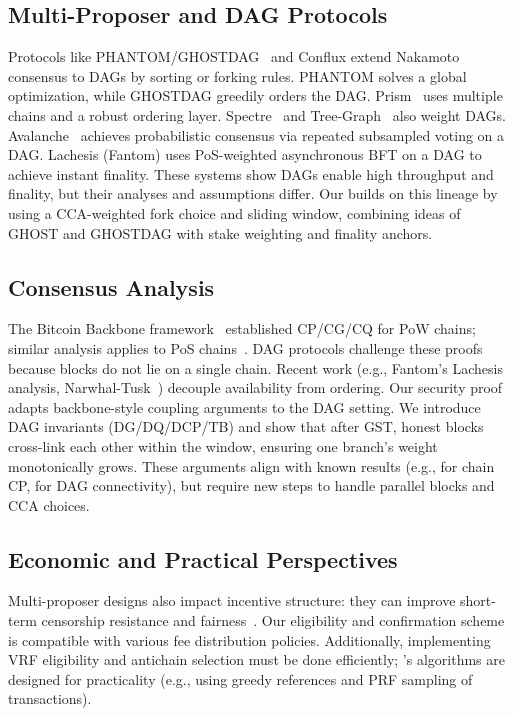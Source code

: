 \subsection{Multi-Proposer and DAG Protocols}
Protocols like PHANTOM/GHOSTDAG~\cite{AFT:SWZ21} and Conflux extend Nakamoto consensus to DAGs by sorting or forking rules. PHANTOM solves a global optimization, while GHOSTDAG greedily orders the DAG. Prism~\cite{Prism} uses multiple chains and a robust ordering layer. Spectre~\cite{EPRINT:MorKulYok18} and Tree-Graph~\cite{EPRINT:ZhaChaLeo18} also weight DAGs. Avalanche~\cite{SnowFamily} achieves probabilistic consensus via repeated subsampled voting on a DAG. Lachesis (Fantom) uses PoS-weighted asynchronous BFT on a DAG to achieve instant finality. These systems show DAGs enable high throughput and finality, but their analyses and assumptions differ. Our \Proj builds on this lineage by using a CCA-weighted fork choice and sliding window, combining ideas of GHOST and GHOSTDAG with stake weighting and finality anchors. %

\subsection{Consensus Analysis}
The Bitcoin Backbone framework~\cite{EC:GarKiaLeo15} established CP/CG/CQ for PoW chains; similar analysis applies to PoS chains~\cite{EC:PasSeeShe17}. DAG protocols challenge these proofs because blocks do not lie on a single chain. Recent work (e.g., Fantom's Lachesis analysis, Narwhal-Tusk~\cite{NarwhalTusk}) decouple availability from ordering. Our security proof adapts backbone-style coupling arguments to the DAG setting. We introduce DAG invariants (DG/DQ/DCP/TB) and show that after GST, honest blocks cross-link each other within the window, ensuring one branch's weight monotonically grows. These arguments align with known results (e.g., \cite{EC:GarKiaLeo15} for chain CP, \cite{AFT:SWZ21} for DAG connectivity), but require new steps to handle parallel blocks and CCA choices.

\subsection{Economic and Practical Perspectives}
Multi-proposer designs also impact incentive structure: they can improve short-term censorship resistance and fairness~\cite{FOCIL,multiFee}. Our eligibility and confirmation scheme is compatible with various fee distribution policies. Additionally, implementing VRF eligibility and antichain selection must be done efficiently; \ProjBase's algorithms are designed for practicality (e.g., using greedy references and PRF sampling of transactions).


